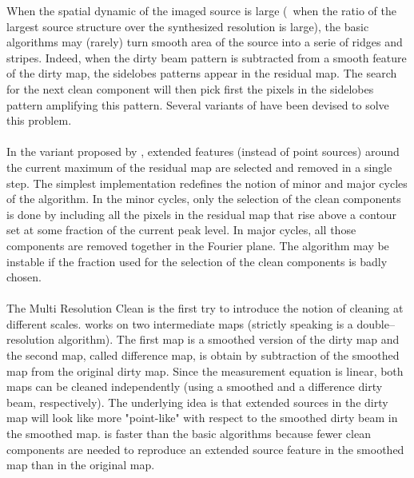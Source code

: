 When the spatial dynamic of the imaged source is large (\ie\ when the ratio
of the largest source structure over the synthesized resolution is large),
the basic \clean{} algorithms may (rarely) turn smooth area of the source
into a serie of ridges and stripes. Indeed, when the dirty beam pattern is
subtracted from a smooth feature of the dirty map, the sidelobes patterns
appear in the residual map. The search for the next clean component will
then pick first the pixels in the sidelobes pattern amplifying this
pattern. Several variants of \clean{} have been devised to solve this
problem.

\paragraph{}

In the \clean{} variant proposed by \cite{steer84}, extended features
(instead of point sources) around the current maximum of the residual map
are selected and removed in a single step. The simplest implementation
redefines the notion of minor and major cycles of the 
algorithm. In the minor cycles, only the selection of the clean components
is done by including all the pixels in the residual map that rise above a
contour set at some fraction of the current peak level. In major cycles,
all those components are removed together in the Fourier plane. The
 algorithm may be instable if the fraction used for the selection
of the clean components is badly chosen.

\paragraph{}

The Multi Resolution Clean \citep[\texttt{MRC},][]{wakker88} is the first
try to introduce the notion of cleaning at different scales. 
works on two intermediate maps (strictly speaking  is a
double--resolution \clean{} algorithm).  The first map is a smoothed
version of the dirty map and the second map, called difference map, is
obtain by subtraction of the smoothed map from the original dirty map.
Since the measurement equation is linear, both maps can be cleaned
independently (using a smoothed and a difference dirty beam, respectively).
The underlying idea is that extended sources in the dirty map will look
like more "point-like" with respect to the smoothed dirty beam in the
smoothed map.  is faster than the basic \clean{} algorithms
because fewer clean components are needed to reproduce an extended source
feature in the smoothed map than in the original map.

